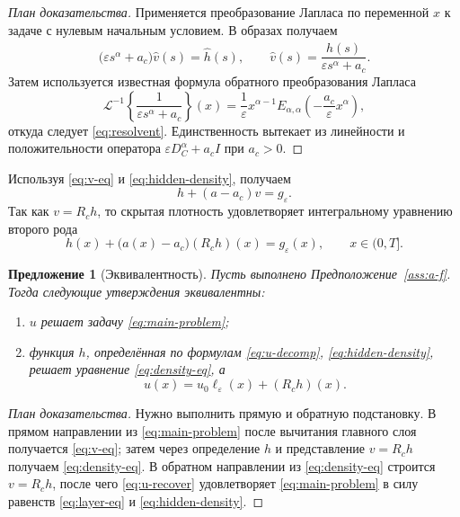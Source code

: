 \documentclass[12pt,a4paper]{article}
\newtheorem{proposition}[theorem]{Предложение}
\theoremstyle{definition}
\newcommand{\eps}{\varepsilon}
\newcommand{\Dc}{D_C^\alpha}
\newcommand{\Rc}{R_c}
\begin{document}
\begin{proof}[План доказательства]
Применяется преобразование Лапласа по переменной $x$ к задаче с нулевым начальным условием.
В образах получаем
\[
\bigl(\eps s^\alpha+a_c\bigr)\widehat{v}(s)=\widehat{h}(s),
\qquad
\widehat{v}(s)=\frac{\widehat{h}(s)}{\eps s^\alpha+a_c}.
\]
Затем используется известная формула обратного преобразования Лапласа
\[
\mathcal{L}^{-1}\left\{\frac{1}{\eps s^\alpha+a_c}\right\}(x)
=
\frac{1}{\eps}x^{\alpha-1}E_{\alpha,\alpha}\!\left(-\frac{a_c}{\eps}x^\alpha\right),
\]
откуда следует \eqref{eq:resolvent}. Единственность вытекает из линейности и положительности
оператора $\eps \Dc + a_c I$ при $a_c>0$.
\end{proof}

Используя \eqref{eq:v-eq} и \eqref{eq:hidden-density}, получаем
\[
h+(a-a_c)v=g_\eps.
\]
Так как $v=\Rc h$, то скрытая плотность удовлетворяет интегральному уравнению второго рода
\begin{equation}
\label{eq:density-eq}
h(x)+\bigl(a(x)-a_c\bigr)(\Rc h)(x)=g_\eps(x), \qquad x\in(0,T].
\end{equation}

\begin{proposition}[Эквивалентность]
\label{prop:equivalence}
Пусть выполнено Предположение~\ref{ass:a-f}. Тогда следующие утверждения эквивалентны:
\begin{enumerate}[label=\textup{(\roman*)}]
\item $u$ решает задачу \eqref{eq:main-problem};
\item функция $h$, определённая по формулам \eqref{eq:u-decomp}, \eqref{eq:hidden-density},
решает уравнение \eqref{eq:density-eq}, а
\begin{equation}
\label{eq:u-recover}
u(x)=u_0\ell_\eps(x)+(\Rc h)(x).
\end{equation}
\end{enumerate}
\end{proposition}

\begin{proof}[План доказательства]
Нужно выполнить прямую и обратную подстановку.
В прямом направлении из \eqref{eq:main-problem} после вычитания главного слоя
получается \eqref{eq:v-eq}; затем через определение $h$ и представление $v=\Rc h$
получаем \eqref{eq:density-eq}.
В обратном направлении из \eqref{eq:density-eq} строится $v=\Rc h$,
после чего \eqref{eq:u-recover} удовлетворяет \eqref{eq:main-problem}
в силу равенств \eqref{eq:layer-eq} и \eqref{eq:hidden-density}.
\end{proof}
\end{document}
